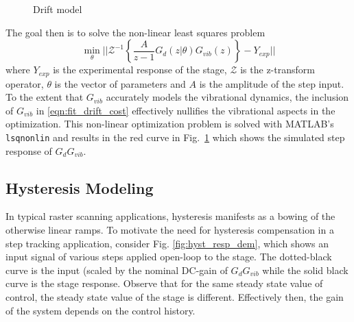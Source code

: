 \documentclass[journal,twocolumn,twoside]{IEEEtran}
\begin{document}
\begin{figure}
  
  \caption{Drift model}
  \label{fig:drift_fit}
\end{figure}
The goal then is to solve the non-linear least squares problem
\begin{equation}
  \min_{\theta}|| \mathcal{Z}^{-1}\left\{ \frac{A}{z-1}G_d(z|\theta)G_{vib}(z)\right\} - Y_{exp}||
  \label{eqn:fit_drift_cost}
\end{equation}
where $Y_{exp}$ is the experimental response of the stage, $\mathcal{Z}$ is the z-transform operator, $\theta$ is the vector of parameters and $A$ is the amplitude of the step input. To the extent that $G_{vib}$ accurately models the vibrational dynamics, the inclusion of $G_{vib}$ in \eqref{eqn:fit_drift_cost} effectively nullifies the vibrational aspects in the optimization.
This non-linear optimization problem is solved with MATLAB's \texttt{lsqnonlin} and results in the red curve in Fig.~\ref{fig:drift_fit} which shows the simulated step response of $G_dG_{vib}$. 


\subsection{Hysteresis Modeling}\label{sec:hyst_model}
In typical raster scanning applications, hysteresis manifests as a bowing of the otherwise linear ramps. To motivate the need for hysteresis compensation in a step tracking application, consider Fig. \ref{fig:hyst_resp_dem}, which shows an input signal of various steps applied open-loop to the stage. The dotted-black curve is the input (scaled by the nominal DC-gain of $G_dG_{vib}$ while the solid black curve is the stage response. Observe that for the same steady state value of control, the steady state value of the stage is different. Effectively then, the gain of the system depends on the control history.
\end{document}
